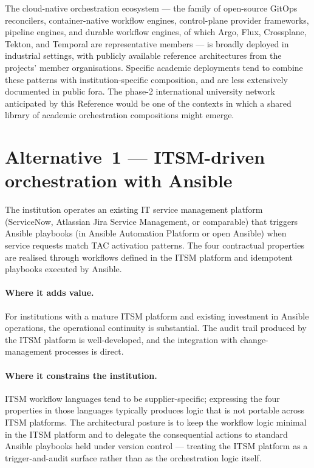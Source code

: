\begin{realworldbox}
\noindent The cloud-native orchestration ecosystem --- the family of
open-source GitOps reconcilers, container-native workflow engines,
control-plane provider frameworks, pipeline engines, and durable
workflow engines, of which Argo, Flux, Crossplane, Tekton, and
Temporal are representative members --- is broadly deployed in
industrial settings, with publicly available reference architectures
from the projects' member organisations.
Specific academic deployments tend to combine these patterns with
institution-specific composition, and are less extensively
documented in public fora. The phase-2 international university
network anticipated by this Reference would be one of the contexts
in which a shared library of academic orchestration compositions
might emerge.
\end{realworldbox}

\section{Alternative~1 --- ITSM-driven orchestration with Ansible}
\label{sec:or-alt1}

\begin{alternativebox}
\noindent The institution operates an existing IT service
management platform (ServiceNow, Atlassian Jira Service Management,
or comparable) that triggers Ansible playbooks (in Ansible Automation
Platform or open Ansible) when service requests match TAC
activation patterns. The four contractual properties are realised
through workflows defined in the ITSM platform and idempotent
playbooks executed by Ansible.
\end{alternativebox}

\paragraph{Where it adds value.} For institutions with a mature
ITSM platform and existing investment in Ansible operations, the
operational continuity is substantial. The audit trail produced by
the ITSM platform is well-developed, and the integration with
change-management processes is direct.

\paragraph{Where it constrains the institution.} ITSM workflow
languages tend to be supplier-specific; expressing the four
properties in those languages typically produces logic that is not
portable across ITSM platforms. The architectural posture is to
keep the workflow logic minimal in the ITSM platform and to delegate
the consequential actions to standard Ansible playbooks held under
version control --- treating the ITSM platform as a
trigger-and-audit surface rather than as the orchestration logic
itself.

